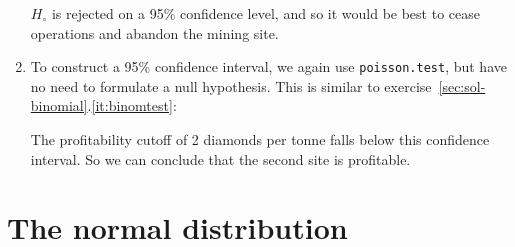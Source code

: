 \begin{enumerate}
$H_\circ$ is rejected on a 95\% confidence level, and so it would be
best to cease operations and abandon the mining site.

\item To construct a 95\% confidence interval, we again use
  \texttt{poisson.test}, but have no need to formulate a null
  hypothesis. This is similar to
  exercise~\ref{sec:sol-binomial}.\ref{it:binomtest}:


The profitability cutoff of 2 diamonds per tonne falls below this
confidence interval. So we can conclude that the second site is
profitable.

\end{enumerate}

\section{The normal distribution}
\label{sec:sol-gauss}

